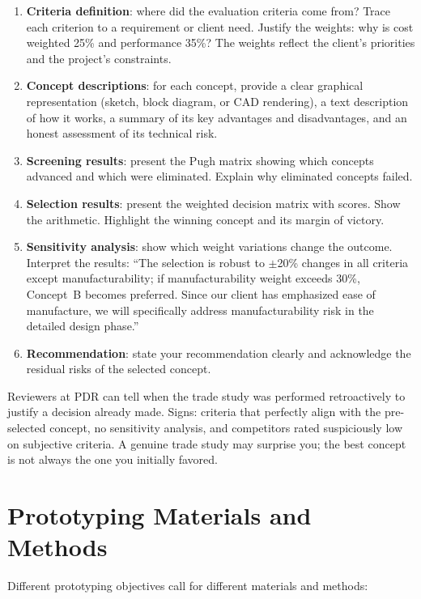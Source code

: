 \begin{enumerate}[nosep,leftmargin=1.5em]
\item \textbf{Criteria definition}: where did the evaluation criteria come from? Trace each criterion to a requirement or client need. Justify the weights: why is cost weighted 25\% and performance 35\%? The weights reflect the client's priorities and the project's constraints.
\item \textbf{Concept descriptions}: for each concept, provide a clear graphical representation (sketch, block diagram, or CAD rendering), a text description of how it works, a summary of its key advantages and disadvantages, and an honest assessment of its technical risk.
\item \textbf{Screening results}: present the Pugh matrix showing which concepts advanced and which were eliminated. Explain why eliminated concepts failed.
\item \textbf{Selection results}: present the weighted decision matrix with scores. Show the arithmetic. Highlight the winning concept and its margin of victory.
\item \textbf{Sensitivity analysis}: show which weight variations change the outcome. Interpret the results: ``The selection is robust to $\pm$20\% changes in all criteria except manufacturability; if manufacturability weight exceeds 30\%, Concept~B becomes preferred. Since our client has emphasized ease of manufacture, we will specifically address manufacturability risk in the detailed design phase.''
\item \textbf{Recommendation}: state your recommendation clearly and acknowledge the residual risks of the selected concept.
\end{enumerate}

\begin{tipbox}
Reviewers at PDR can tell when the trade study was performed retroactively to justify a decision already made. Signs: criteria that perfectly align with the pre-selected concept, no sensitivity analysis, and competitors rated suspiciously low on subjective criteria. A genuine trade study may surprise you; the best concept is not always the one you initially favored.
\end{tipbox}

\section{Prototyping Materials and Methods}
Different prototyping objectives call for different materials and methods:

